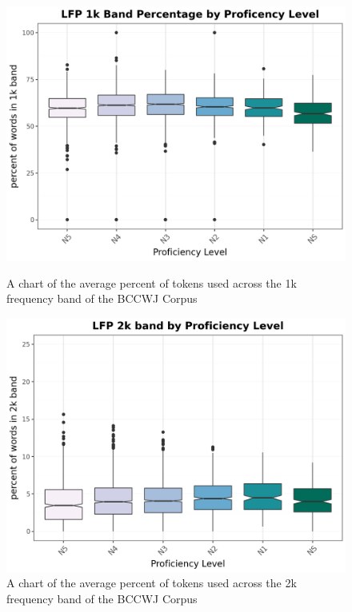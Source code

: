 \begin{figure}[htbp]
    \centering
    \begin{minipage}{.48\textwidth}
        \centering
    \includegraphics[scale=.4]{img/LFP/1k}
    \caption[Percentage of tokens used from the BCCWJ Corpus 1k band]{A chart of the average percent of tokens used across the 1k frequency band of the BCCWJ Corpus}
        \label{fig:1kband}
    \end{minipage}
    \hfill
\begin{minipage}{.48\textwidth}
        \centering
        \includegraphics[scale=.4]{img/LFP/2k}
        \caption[Percentage of tokens used from the BCCWJ Corpus 2k band]{A chart of the average percent of tokens used across the 2k frequency band of the BCCWJ Corpus}
\label{fig:2kband}
\end{minipage}
    \end{figure}



